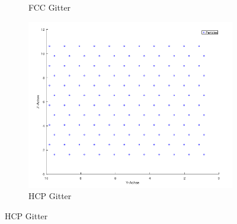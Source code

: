 \documentclass[12pt,a4paper,ngerman]{article}
\begin{document}
\begin{figure}[ht]
\begin{subfigure}[b]{0.3\textwidth}
		\caption{FCC Gitter}
	\end{subfigure}
	\begin{subfigure}[b]{0.3\textwidth}
		\includegraphics[width=\textwidth]{data/HCP_perfect.png}
		\caption{HCP Gitter}
	\end{subfigure}
	

\end{figure}
\end{document}
